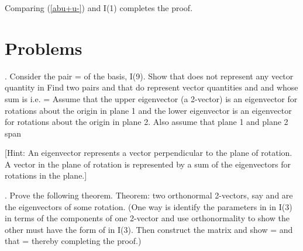 \documentclass[a4paper,12pt]{article}
\begin{document}
	Comparing (\ref{abu+u-}) and I(1) completes the proof.





 \section{Problems} %

. Consider the pair \coordHE{} = \coordHE{} of the \coordHE{} basis, I(9). Show that \coordHE{} does not represent any vector quantity \myHighlight{$\chi$}\coordHE{} in \coordHE{} Find two pairs \coordHE{} and \coordHE{} that do represent vector quantities \coordHE{} and \coordHE{} and whose sum is \coordHE{} i.e. \coordHE{} = \coordHE{} Assume that the upper eigenvector \coordHE{} (a 2-vector) is an eigenvector for rotations about the origin in plane 1 and the lower eigenvector \coordHE{} is an eigenvector for rotations about the origin in plane 2. Also assume that plane 1 and plane 2 span \coordHE{} 

[Hint: An eigenvector represents a vector perpendicular to the plane of rotation. A vector in the plane of rotation is represented by a sum of the eigenvectors for rotations in the plane.]



\vspace{0.3cm}



. Prove the following theorem. Theorem: two orthonormal 2-vectors, say \myHighlight{$\delta$}\coordHE{} and \myHighlight{$\epsilon,$}\coordHE{} are the eigenvectors of some rotation. (One way is identify the parameters in \coordHE{} in I(3) in terms of the components of one 2-vector and use orthonormality to show the other must have the form of \coordHE{} in I(3). Then construct the matrix \coordHE{} and show \coordHE{} = \coordHE{} and that \coordHE{} = \coordHE{} thereby completing the proof.) 
\end{document}
